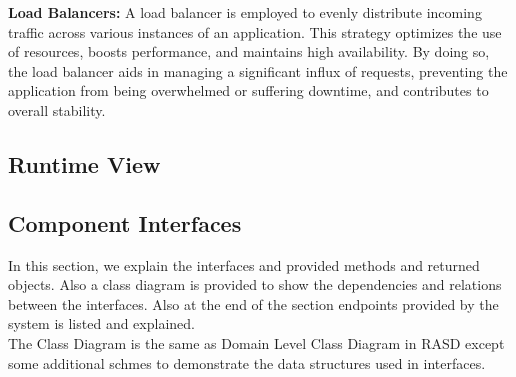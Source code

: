 \indent \textbf{Load Balancers:} A load balancer is employed to evenly distribute incoming traffic across various instances of an application. This strategy optimizes the use of resources, boosts performance, and maintains high availability. By doing so, the load balancer aids in managing a significant influx of requests, preventing the application from being overwhelmed or suffering downtime, and contributes to overall stability.



\subsection{Runtime View}





\subsection{Component Interfaces}
In this section, we explain the interfaces and provided methods and returned objects. Also a class diagram is provided to show the dependencies and relations between the interfaces. Also at the end of the section endpoints provided by the system is listed and explained.
\\
The Class Diagram is the same as Domain Level Class Diagram in RASD except some additional schmes to demonstrate the data structures used in interfaces.
